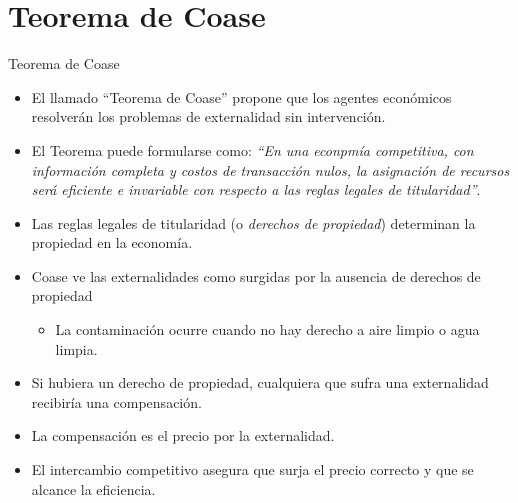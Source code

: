 \section[Coase]{Teorema de Coase}

\begin{frame}{Teorema de Coase}
	\begin{itemize}
		\item El llamado ``Teorema de Coase'' propone que los agentes económicos resolverán los problemas de externalidad sin intervención.
		\item El Teorema puede formularse como:
			\emph{``En una econpmía competitiva, con información completa y costos de transacción nulos, la asignación de recursos será eficiente e invariable con respecto a las reglas legales de titularidad''}.
		\item Las reglas legales de titularidad (o \emph{derechos de propiedad}) determinan la propiedad en la economía.
		\item Coase ve las externalidades como surgidas por la ausencia de derechos de propiedad
			\begin{itemize}
				\item La contaminación ocurre cuando no hay derecho a aire limpio o agua limpia.
			\end{itemize}
		\item Si hubiera un derecho de propiedad, cualquiera que sufra una externalidad recibiría una compensación.
		\item La compensación es el precio por la externalidad.
		\item El intercambio competitivo asegura que surja el precio correcto y que se alcance la eficiencia.
	\end{itemize}
\end{frame}

